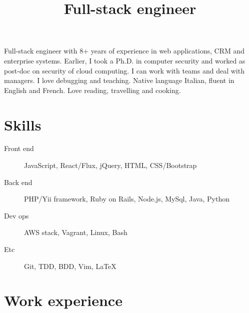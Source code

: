 \documentclass[a4paper,sans,10pt]{moderncv} %
\title{Full-stack engineer}
\newcommand{\experience}{Experience}
\newcommand{\skills}{Computer Skills}
\renewcommand{\experience}{Esperienze di lavoro}
\renewcommand{\skills}{Competenze informatiche}
\renewcommand{\experience}{Work experience}
\renewcommand{\skills}{Skills}
\begin{document}
\maketitle

	\vspace{-1.5em}  %
\justify
Full-stack engineer with 8+ years of experience in web applications, CRM and enterprise systems.
Earlier, I took a Ph.D. in computer security and worked as post-doc on security of cloud computing.
I can work with teams and deal with managers. I love debugging and teaching. Native language Italian, fluent in English and French. Love reading, travelling and cooking.

\section{\skills}
\begin{description}
\item [Front end] JavaScript, React/Flux, jQuery, HTML, CSS/Bootstrap
\item [Back end] PHP/Yii framework, Ruby on Rails, Node.js, MySql, Java, Python
\item [Dev ops] AWS stack, Vagrant, Linux, Bash
\item [Etc] Git, TDD, BDD, Vim, LaTeX
\end{description}

  \section{\experience}
\end{document}
